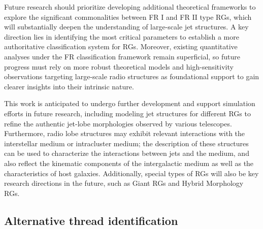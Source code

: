 \documentclass{aa}
\begin{document}
Future research should prioritize developing additional theoretical frameworks to explore the significant commonalities between FR I and FR II type RGs, which will substantially deepen the understanding of large-scale jet structures. A key direction lies in identifying the most critical parameters to establish a more authoritative classification system for RGs. Moreover, existing quantitative analyses under the FR classification framework remain superficial, so future progress must rely on more robust theoretical models and high-sensitivity observations targeting large-scale radio structures as foundational support to gain clearer insights into their intrinsic nature.


This work is anticipated to undergo further development and support simulation efforts in future research, including modeling jet structures for different RGs to refine the authentic jet-lobe morphologies observed by various telescopes. Furthermore, radio lobe structures may exhibit relevant interactions with the interstellar medium or intracluster medium; the description of these structures can be used to characterize the interactions between jets and the medium, and also reflect the kinematic components of the intergalactic medium as well as the characteristics of host galaxies. Additionally, special types of RGs will also be key research directions in the future, such as Giant RGs and Hybrid Morphology RGs.






% 
% 
\begin{appendix}
\section{Alternative thread identification}\label{app:Alt} 




\end{appendix}
\end{document}
